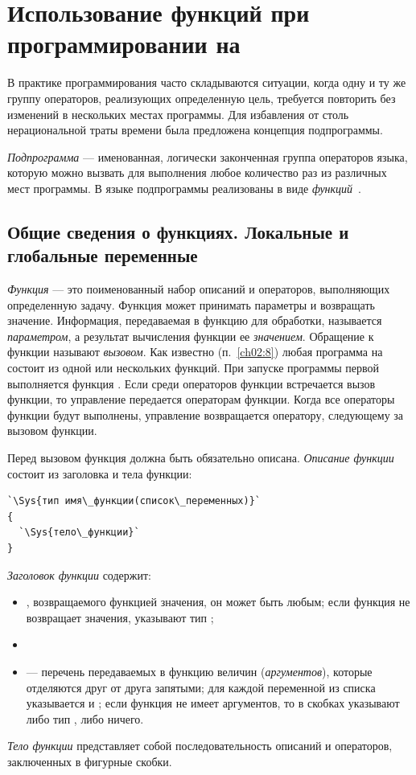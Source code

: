 \chapter[Использование функций при программировании на \Sys{C++}]{Использование функций при программировании на }\label{ch04}
В практике программирования часто складываются ситуации, когда одну и ту же группу операторов, реализующих определенную
цель, требуется повторить без изменений в нескольких местах программы. Для избавления от столь нерациональной траты
времени была предложена концепция подпрограммы.

\emph{Подпрограмма} --- именованная, логически законченная группа операторов языка,
которую можно вызвать для выполнения любое количество раз из различных мест программы. В языке  подпрограммы
реализованы в виде \emph{функций}~\cite{KR}.

\section[Общие сведения о функциях]{Общие сведения о функциях. Локальные и
глобальные переменные}
\emph{Функция} --- это поименованный набор описаний и операторов, выполняющих определенную
задачу. Функция может принимать параметры и возвращать значение. Информация, передаваемая в функцию для обработки,
называется \emph{параметром}, а результат вычисления функции ее \emph{значением}. Обращение к
функции называют \emph{вызовом}. Как известно (п.~\ref{ch02:8}) любая программа на  состоит из одной или
нескольких функций. При запуске программы первой выполняется функция . Если среди операторов
функции  встречается вызов функции, то управление передается операторам функции. Когда все
операторы функции будут выполнены, управление возвращается оператору, следующему за вызовом функции.

Перед вызовом функция должна быть обязательно описана. \emph{Описание функции}
состоит из заголовка и тела функции:
\begin{lstlisting}
`\Sys{тип имя\_функции(список\_переменных)}`
{
  `\Sys{тело\_функции}`
}
\end{lstlisting}
\emph{Заголовок функции} содержит:

\begin{itemize}
\item {}, возвращаемого функцией значения, он может быть любым; если функция не возвращает значения,
указывают тип ;
\item {}
\item {} --- перечень передаваемых в функцию величин (\emph{аргументов}),
которые отделяются друг от друга запятыми; для каждой переменной из списка указывается  и
; если функция не имеет аргументов, то в скобках указывают либо тип , либо
ничего.
\end{itemize}
\emph{Тело функции} представляет собой последовательность описаний и
операторов, заключенных в фигурные скобки.

